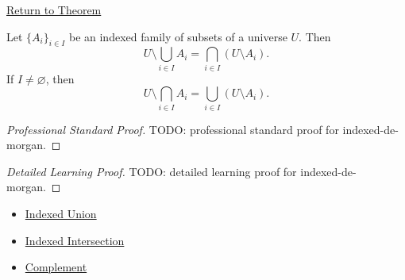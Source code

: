 \newpage
{}
\label{prf:indexed-de-morgan}

\begin{remark*}[Return]
\hyperref[thm:indexed-de-morgan]{Return to Theorem}
\end{remark*}

\begin{theorem*}
Let $\{A_i\}_{i\in I}$ be an indexed family of subsets of a universe $U$.
Then
\[
U\setminus\bigcup_{i\in I}A_i
=
\bigcap_{i\in I}(U\setminus A_i).
\]
If $I\neq\varnothing$, then
\[
U\setminus\bigcap_{i\in I}A_i
=
\bigcup_{i\in I}(U\setminus A_i).
\]
\end{theorem*}

\begin{proof}[Professional Standard Proof]
\LRAProofBodyStart
TODO: professional standard proof for indexed-de-morgan.
\end{proof}

\begin{proof}[Detailed Learning Proof]
\LRAProofBodyStart
TODO: detailed learning proof for indexed-de-morgan.
\end{proof}

\begin{remark*}
\end{remark*}

\begin{dependencies}
\begin{itemize}
  \item \hyperref[def:indexed-union]{Indexed Union}
  \item \hyperref[def:indexed-intersection]{Indexed Intersection}
  \item \hyperref[def:complement]{Complement}
\end{itemize}
\end{dependencies}

\clearpage
